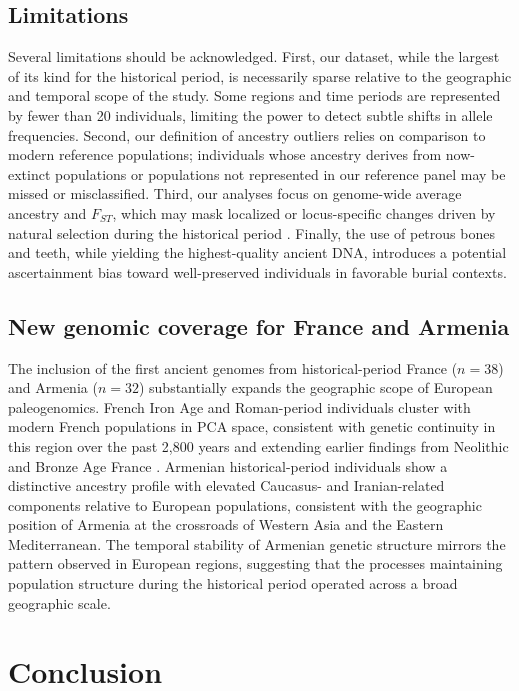 \documentclass[11pt,a4paper]{article}
\begin{document}
\subsection{Limitations}
Several limitations should be acknowledged. First, our dataset, while the largest of its kind for the historical period, is necessarily sparse relative to the geographic and temporal scope of the study. Some regions and time periods are represented by fewer than 20 individuals, limiting the power to detect subtle shifts in allele frequencies. Second, our definition of ancestry outliers relies on comparison to modern reference populations; individuals whose ancestry derives from now-extinct populations or populations not represented in our reference panel may be missed or misclassified. Third, our analyses focus on genome-wide average ancestry and $F_{ST}$, which may mask localized or locus-specific changes driven by natural selection during the historical period \citep{mathieson2015genome}. Finally, the use of petrous bones and teeth, while yielding the highest-quality ancient DNA, introduces a potential ascertainment bias toward well-preserved individuals in favorable burial contexts.

\subsection{New genomic coverage for France and Armenia}
The inclusion of the first ancient genomes from historical-period France ($n = 38$) and Armenia ($n = 32$) substantially expands the geographic scope of European paleogenomics. French Iron Age and Roman-period individuals cluster with modern French populations in PCA space, consistent with genetic continuity in this region over the past 2,800 years and extending earlier findings from Neolithic and Bronze Age France \citep{brunel2020ancient}. Armenian historical-period individuals show a distinctive ancestry profile with elevated Caucasus- and Iranian-related components relative to European populations, consistent with the geographic position of Armenia at the crossroads of Western Asia and the Eastern Mediterranean. The temporal stability of Armenian genetic structure mirrors the pattern observed in European regions, suggesting that the processes maintaining population structure during the historical period operated across a broad geographic scale.

\section{Conclusion}
\end{document}
